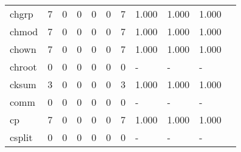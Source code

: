 \begin{longtable}{lp{1.10cm}p{1.10cm}p{1.10cm}p{1.10cm}p{1.10cm}p{1.10cm}p{1.10cm}p{1.10cm}p{1.10cm}p{1.10cm}}
chgrp     &                      7 &                                  0 &                                 0 &                                0 &                                 0 &                               7 &                          1.000 &                                 1.000 &                               1.000 \\
chmod     &                      7 &                                  0 &                                 0 &                                0 &                                 0 &                               7 &                          1.000 &                                 1.000 &                               1.000 \\
chown     &                      7 &                                  0 &                                 0 &                                0 &                                 0 &                               7 &                          1.000 &                                 1.000 &                               1.000 \\
chroot    &                      0 &                                  0 &                                 0 &                                0 &                                 0 &                               0 &                              - &                                     - &                                   - \\
cksum     &                      3 &                                  0 &                                 0 &                                0 &                                 0 &                               3 &                          1.000 &                                 1.000 &                               1.000 \\
comm      &                      0 &                                  0 &                                 0 &                                0 &                                 0 &                               0 &                              - &                                     - &                                   - \\
cp        &                      7 &                                  0 &                                 0 &                                0 &                                 0 &                               7 &                          1.000 &                                 1.000 &                               1.000 \\
csplit    &                      0 &                                  0 &                                 0 &                                0 &                                 0 &                               0 &                              - &                                     - &                                   - \\

\end{longtable}
